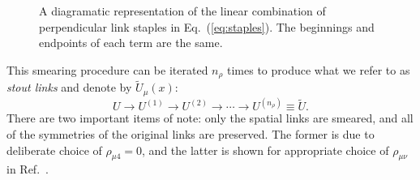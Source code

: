     \begin{figure}
        \centering
        \caption{A diagramatic representation of the linear combination of perpendicular link staples in Eq.~(\ref{eq:staples}). The beginnings and endpoints of each term are the same.}
        \label{fig:staples}
    \end{figure}
    This smearing procedure can be iterated $n_\rho$ times to produce what we refer to as \textit{stout links} and denote by $\widetilde{U}_\mu(x)$:
    \begin{equation}
        U \rightarrow U^{(1)} \rightarrow U^{(2)} \rightarrow \cdots \rightarrow U^{\left(n_{\rho}\right)} \equiv \widetilde{U}.
    \end{equation}
    There are two important items of note: only the spatial links are smeared, and all of the symmetries of the original links are preserved. The former is due to deliberate choice of $\rho_{\mu 4} = 0$, and the latter is shown for appropriate choice of $\rho_{\mu \nu}$ in Ref.~\cite{Morningstar:2003gk}.
    
